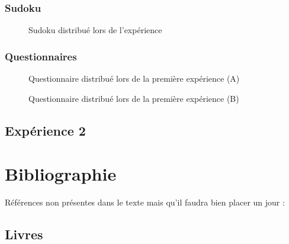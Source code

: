 \documentclass[12pt,fleqn,oneside,openany]{book} %
\begin{document}
\subsection*{Sudoku} \label{sec:Sudoku}
\begin{figure}[htp]  %
	\caption{Sudoku distribué lors de l'expérience}
\end{figure}  

\newpage
\subsection*{Questionnaires} \label{sec:Questionnaires}
\begin{figure}[htp] 
	\caption{Questionnaire distribué lors de la première expérience (A)}
\end{figure}

\newpage
\begin{figure}[htp] 
	\caption{Questionnaire distribué lors de la première expérience (B)}
\end{figure}

\newpage
\section*{Expérience 2}



\chapter{Bibliographie}
\begin{remark}
	Références non présentes dans le texte mais qu'il faudra bien placer un jour : \cite{ref1} \cite{vidnul} \cite{vidcool} \cite{imgtitre} \cite{imgheader1} \cite{analysedonnees}
\end{remark}
\section*{Livres}
\printbibliography[heading=bibempty,type=book]
\end{document}
